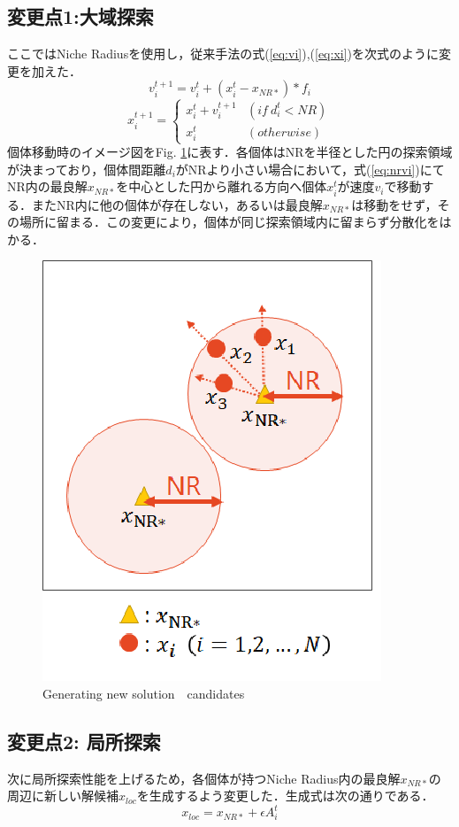 \documentclass{jarticle}
\begin{document}
\subsection{変更点1:大域探索}
ここではNiche Radiusを使用し，従来手法の式(\ref{eq:vi}),(\ref{eq:xi})を次式のように変更を加えた．
\begin{equation}
\label{eq:nrvi}
v_i^{t+1}=v_i^t+(x_i^t-x_{NR*})*f_i
\end{equation}
\begin{equation}
\label{eq:nrxi}
x_i^{t+1}= \begin{cases}
x_i^t+v_i^{t+1} & (if \ d_i^t < NR) \\
x_i^t & (otherwise)
\end{cases}
\end{equation}
個体移動時のイメージ図をFig. \ref{fig:nr}に表す．各個体はNRを半径とした円の探索領域が決まっており，個体間距離${d_i}$がNRより小さい場合において，式(\ref{eq:nrvi})にてNR内の最良解${x_{NR*}}$を中心とした円から離れる方向へ個体${x_i^t}$が速度${v_i}$で移動する．またNR内に他の個体が存在しない，あるいは最良解$x_{NR*}$は移動をせず，その場所に留まる．この変更により，個体が同じ探索領域内に留まらず分散化をはかる．
\begin{figure}[h]
  \centering
  \includegraphics[width=0.5\linewidth]{eps/niche_radius.eps}
  \caption{Generating new solution　candidates}
  \label{fig:nr}
\end{figure}

\subsection{変更点2: 局所探索}
次に局所探索性能を上げるため，各個体が持つNiche Radius内の最良解${x_{NR*}}$の周辺に新しい解候補${x_{loc}}$を生成するよう変更した．生成式は次の通りである．
\begin{equation}
\label{eq:nrloc}
x_{loc}=x_{NR*} + \epsilon A_i^t
\end{equation}
\end{document}

